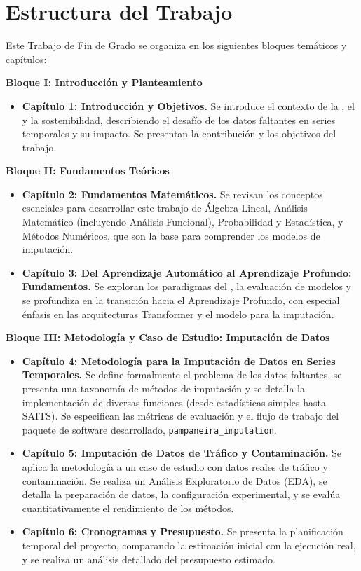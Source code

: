 \section{Estructura del Trabajo}
\label{subsec:estructura_trabajo_bloques}
Este Trabajo de Fin de Grado se organiza en los siguientes bloques temáticos y capítulos:

\textbf{Bloque I: Introducción y Planteamiento}
\begin{itemize}
    \item \textbf{Capítulo 1: Introducción y Objetivos.} Se introduce el contexto de la , el  y la sostenibilidad, describiendo el desafío de los datos faltantes en series temporales  y su impacto. Se presentan la contribución y los objetivos del trabajo.
\end{itemize}

\textbf{Bloque II: Fundamentos Teóricos}
\begin{itemize}
    \item \textbf{Capítulo 2: Fundamentos Matemáticos.} Se revisan los conceptos esenciales para desarrollar este trabajo de Álgebra Lineal, Análisis Matemático (incluyendo Análisis Funcional), Probabilidad y Estadística, y Métodos Numéricos, que son la base para comprender los modelos de imputación.
    \item \textbf{Capítulo 3: Del Aprendizaje Automático al Aprendizaje Profundo: Fundamentos.} Se exploran los paradigmas del , la evaluación de modelos y se profundiza en la transición hacia el Aprendizaje Profundo, con especial énfasis en las arquitecturas Transformer y el modelo  para la imputación.
\end{itemize}

\newpage

\textbf{Bloque III: Metodología y Caso de Estudio: Imputación de Datos}
\begin{itemize}
    \item \textbf{Capítulo 4: Metodología para la Imputación de Datos en Series Temporales.} Se define formalmente el problema de los datos faltantes, se presenta una taxonomía de métodos de imputación y se detalla la implementación de diversas funciones (desde estadísticas simples hasta SAITS). Se especifican las métricas de evaluación y el flujo de trabajo del paquete de software desarrollado, \texttt{pampaneira\_imputation}.
    \item \textbf{Capítulo 5: Imputación de Datos de Tráfico y Contaminación.} Se aplica la metodología a un caso de estudio con datos reales de tráfico y contaminación. Se realiza un Análisis Exploratorio de Datos (EDA), se detalla la preparación de datos, la configuración experimental, y se evalúa cuantitativamente el rendimiento de los métodos.

    \item \textbf{Capítulo 6: Cronogramas y Presupuesto.} Se presenta la planificación temporal del proyecto, comparando la estimación inicial con la ejecución real, y se realiza un análisis detallado del presupuesto estimado.
\end{itemize}

